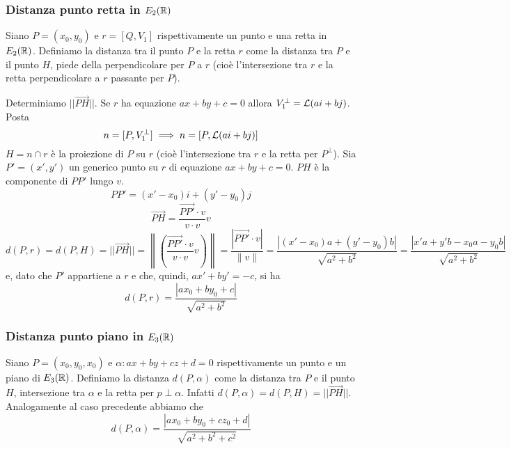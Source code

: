 \subsubsection{Distanza punto retta in \(E_2(\RR )\)}
Siano \(P = (x_0, y_0)\) e \(r = [Q, V_1]\) rispettivamente un punto e una retta in \(E_{2}(\RR)\). Definiamo la distanza tra il punto \(P\) e la retta \(r\) come la distanza tra \(P\) e il punto \(H\), piede della perpendicolare per \(P\) a \(r\) (cioè l'intersezione tra \(r\) e la retta perpendicolare a \(r\) passante per \(P\)). 
\begin{center}
\end{center}
Determiniamo \(||\vec{{PH}}||\). Se \(r\) ha equazione \(ax + by +c = 0\) allora \(V_1^{\perp} = \mathcal{L}(a i + b j)  \). Posta \[n = [P, V_1^{\perp}] \implies n = [P, \mathcal{L}(a i + bj) ]\]
\(H = n \cap r \) è la proiezione di \(P\) su \(r\) (cioè l'intersezione tra \(r\) e la retta per \(P^{\perp} \)). Sia \(P' = (x', y')\) un generico punto su \(r\) di equazione \(ax + by + c = 0\). \(PH\) è la componente di \(PP'\) lungo \(v\). \[PP' = (x'-x_0) i + (y' - y_0)j\]\[
    \vec{{PH}} = \frac{\vec{PP'} \cdot v}{ v \cdot v } v
\] \[
d(P,r) = d (P, H) = || \vec{{PH}} || = \left\| \left( \frac{\vec{{PP'}} \cdot v}{v \cdot v} v \right)  \right\| = \frac{|\vec{PP'} \cdot v| }{\|v\|} = \frac{|(x'-x_0) a + (y' - y_0) b| }{\sqrt{a^2 + b ^2} } = \frac{|x'a + y'b - x_0a - y_0b| }{\sqrt{a^2 + b ^2} }
\] e, dato che \(P'\) appartiene a \(r\) e che, quindi, \(ax' + by' = -c\), si ha \[
d(P, r) = \frac{|ax_0 + by_0 + c|}{\sqrt{a^{2} + b^{2} }}
\] 
\subsubsection{Distanza punto piano in \(E_3(\RR )\)}
Siano \(P = (x_0, y_0, x_0)\) e \(\alpha : ax + by + cz + d = 0\) rispettivamente un punto e un piano di \(E_{3}(\RR)\). Definiamo la distanza \(d(P, \alpha)\) come la distanza tra \(P\) e il punto \(H\), intersezione tra \(\alpha\) e la retta per \(p \perp \alpha \). Infatti \(d(P, \alpha )= d (P, H) = ||\vec{{PH}}||\). Analogamente al caso precedente abbiamo che \[
    d(P, \alpha ) = \frac{|ax_0 + by_0 + cz_0 + d|}{\sqrt{a^{2} + b^{2} + c^{2} }}
\]

